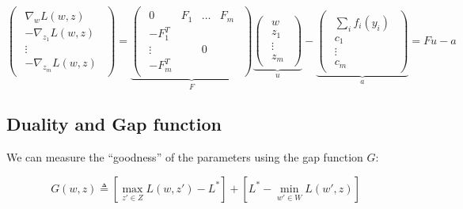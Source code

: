 \begin{equation}
  \begin{pmatrix}
    \begin{array}{c} \nabla_{ w} {L}( w, z)\\
      -\nabla_{ z_1} {L}( w, z)\\
      \vdots\\
      -\nabla_{ z_m} {L}( w, z)
    \end{array}
  \end{pmatrix} =
  \underbrace{
    \begin{pmatrix}
      \begin{array}{cccc}
        0 &  F_1 & \dots &  F_m\\
        - F_1^T & & &\\
        \vdots & &  0 &\\
        - F_m^T & & &
      \end{array}
    \end{pmatrix}}_{ F}
  \underbrace{
    \begin{pmatrix}
      \begin{array}{c}
         w\\
         z_1\\
        \vdots\\
         z_m
      \end{array}
    \end{pmatrix}}_{ u}-
  \underbrace{
    \begin{pmatrix}
      \begin{array}{c}
        \sum_i  f_i( y_i)\\
         c_1\\
        \vdots\\
         c_m
      \end{array}
    \end{pmatrix}}_{ a} =  F  u -  a
  \end{equation}


\clearpage
\subsection{Duality and Gap function}
We can measure the ``goodness'' of the parameters using the gap function
${G}$:

\begin{equation}
  {G}( w,  z) \triangleq \left[ \max_{ z' \in {Z}}
{L}( w, z') - {L}^* \right] + \left[ {L}^* -
\min_{ w' \in {W}} {L}( w',  z) \right]

\end{equation}

